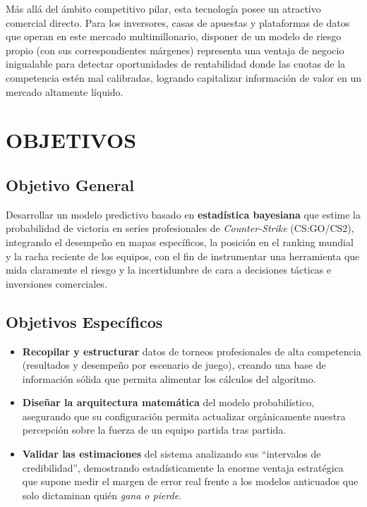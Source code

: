 \documentclass[twocolumn,10pt]{article}
\begin{document}
Más allá del ámbito competitivo pilar, esta tecnología posee un atractivo comercial directo. Para los inversores, casas de apuestas y plataformas de datos que operan en este mercado multimillonario, disponer de un modelo de riesgo propio (con sus correspondientes márgenes) representa una ventaja de negocio inigualable para detectar oportunidades de rentabilidad donde las cuotas de la competencia estén mal calibradas, logrando capitalizar información de valor en un mercado altamente líquido.

\section{OBJETIVOS}

\subsection{Objetivo General}

Desarrollar un modelo predictivo basado en \textbf{estadística bayesiana} que estime la probabilidad de victoria en series profesionales de \textit{Counter-Strike} (CS:GO/CS2), integrando el desempeño en mapas específicos, la posición en el ranking mundial y la racha reciente de los equipos, con el fin de instrumentar una herramienta que mida claramente el riesgo y la incertidumbre de cara a decisiones tácticas e inversiones comerciales.

\subsection{Objetivos Específicos}

\begin{itemize}[noitemsep]
    \item \textbf{Recopilar y estructurar} datos de torneos profesionales de alta competencia (resultados y desempeño por escenario de juego), creando una base de información sólida que permita alimentar los cálculos del algoritmo.
    \item \textbf{Diseñar la arquitectura matemática} del modelo probabilístico, asegurando que su configuración permita actualizar orgánicamente nuestra percepción sobre la fuerza de un equipo partida tras partida.
    \item \textbf{Validar las estimaciones} del sistema analizando sus ``intervalos de credibilidad'', demostrando estadísticamente la enorme ventaja estratégica que supone medir el margen de error real frente a los modelos anticuados que solo dictaminan quién \textit{gana o pierde}.
\end{itemize}
\end{document}
